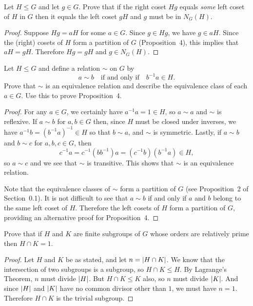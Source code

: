  Let $H\leq G$ and let $g\in G$. Prove that if the right
coset $Hg$ equals {\em some} left coset of $H$ in $G$ then it equals
the left coset $gH$ and $g$ must be in $N_G(H)$.
\begin{proof}
  Suppose $Hg = aH$ for some $a\in G$. Since $g\in Hg$, we have
  $g\in aH$. Since the (right) cosets of $H$ form a partition of $G$
  (Proposition~4), this implies that $aH = gH$. Therefore $Hg = gH$
  and $g\in N_G(H)$.
\end{proof}

 Let $H\leq G$ and define a relation $\sim$ on $G$ by
\begin{equation*}
  a\sim b \quad\text{if and only if}\quad b^{-1}a\in H.
\end{equation*}
Prove that $\sim$ is an equivalence relation and describe the
equivalence class of each $a\in G$. Use this to prove Proposition~4.
\begin{proof}
  For any $a\in G$, we certainly have $a^{-1}a = 1\in H$, so $a\sim a$
  and $\sim$ is reflexive. If $a\sim b$ for $a,b\in G$ then, since $H$
  must be closed under inverses, we have
  $a^{-1}b = (b^{-1}a)^{-1} \in H$ so that $b\sim a$, and $\sim$ is
  symmetric. Lastly, if $a\sim b$ and $b\sim c$ for $a,b,c\in G$, then
  \begin{equation*}
    c^{-1}a
    = c^{-1}(bb^{-1})a
    = (c^{-1}b)(b^{-1}a) \in H,
  \end{equation*}
  so $a\sim c$ and we see that $\sim$ is transitive. This shows that
  $\sim$ is an equivalence relation.

  Note that the equivalence classes of $\sim$ form a partition of $G$
  (see Proposition~2 of Section~0.1). It is not difficult to see that
  $a\sim b$ if and only if $a$ and $b$ belong to the same left coset
  of $H$. Therefore the left cosets of $H$ form a partition of $G$,
  providing an alternative proof for Proposition~4.
\end{proof}

 Prove that if $H$ and $K$ are finite subgroups of $G$ whose
orders are relatively prime then $H\cap K = 1$.
\begin{proof}
  Let $H$ and $K$ be as stated, and let $n = \lvert{H\cap K}\rvert$. We know
  that the intersection of two subgroups is a subgroup, so
  $H\cap K\leq H$. By Lagrange's Theorem, $n$ must divide
  $\lvert{H}\rvert$. But $H\cap K\leq K$ also, so $n$ must divide
  $\lvert{K}\rvert$. And since $\lvert{H}\rvert$ and $\lvert{K}\rvert$ have no common divisor
  other than $1$, we must have $n = 1$. Therefore $H\cap K$ is the
  trivial subgroup.
\end{proof}

